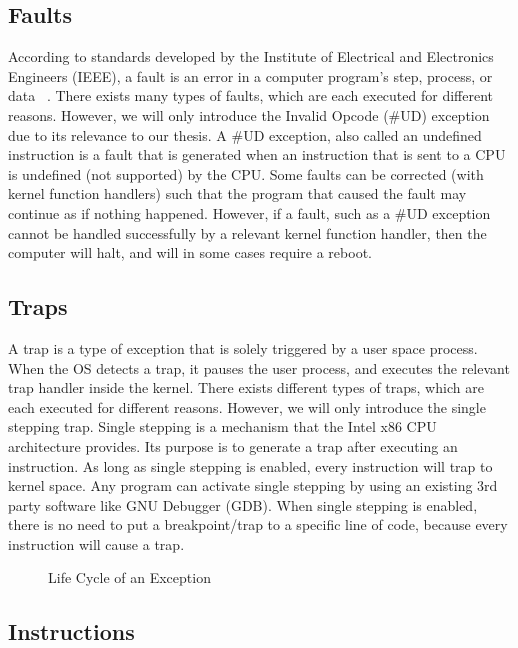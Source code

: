 \documentclass{report}
\begin{document}
\begin{spacing}{1.5}
\subsection{Faults}
{\large
According to standards developed by the Institute of Electrical and Electronics Engineers (IEEE), a fault is an error in a computer program's step, process, or data ~\cite{diallo2017fault}. There exists many types of faults, which are each executed for different reasons. However, we will only introduce the Invalid Opcode (\#UD) exception due to its relevance to our thesis. A \#UD exception, also called an undefined instruction is a fault that is generated when an instruction that is sent to a CPU is undefined (not supported) by the CPU. Some faults can be corrected (with kernel function handlers) such that the program that caused the fault may continue as if nothing happened. However, if a fault, such as a \#UD exception cannot be handled successfully by a relevant kernel function handler, then the computer will halt, and will in some cases require a reboot.
}


\subsection{Traps}
{\large
A trap is a type of exception that is solely triggered by a user space process. When the OS detects a trap, it pauses the user process, and executes the relevant trap handler inside the kernel. There exists different types of traps, which are each executed for different reasons. However, we will only introduce the single stepping trap. Single stepping is a mechanism that the Intel x86 CPU architecture provides. Its purpose is to generate a trap after executing an instruction. As long as single stepping is enabled, every instruction will trap to kernel space. Any program can activate single stepping by using an existing 3rd party software like GNU Debugger (GDB). When single stepping is enabled, there is no need to put a breakpoint/trap to a specific line of code, because every instruction will cause a trap.
\newline
}


\newpage
\vfill
\begin{figure}[ht]
  \caption{Life Cycle of an Exception}
\end{figure}

\subsection{Instructions}


\end{spacing}
\end{document}
